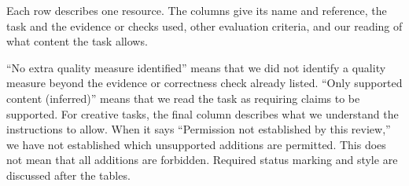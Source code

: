 \documentclass{clv2025}
\begin{document}
Each row describes one resource. The columns give its name and reference,
the task and the evidence or checks used, other evaluation criteria, and
our reading of what content the task allows.

``No extra quality measure identified'' means that we did not identify a
quality measure beyond the evidence or correctness check already listed.
``Only supported content (inferred)'' means that we read the task as requiring
claims to be supported. For creative tasks, the final column describes what
we understand the instructions to allow. When it says ``Permission not
established by this review,'' we have not established which unsupported
additions are permitted. This does not mean that all additions are forbidden.
Required status marking and style are discussed after the tables.

\begingroup
\small
\setlength{\tabcolsep}{3pt}
\renewcommand{\arraystretch}{1.0}
\end{document}
